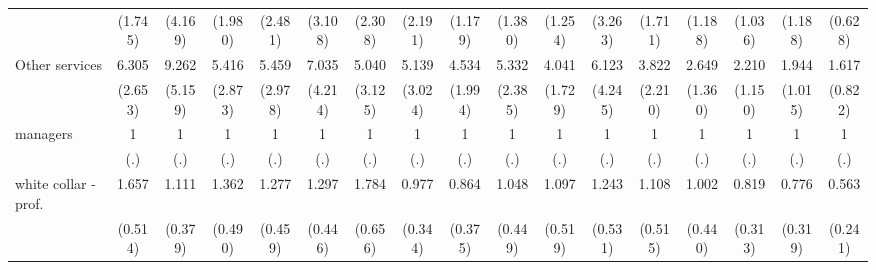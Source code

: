 {\begin{tabular}{l*{16}{c}}
                    &     (1.745)         &     (4.169)         &     (1.980)         &     (2.481)         &     (3.108)         &     (2.308)         &     (2.191)         &     (1.179)         &     (1.380)         &     (1.254)         &     (3.263)         &     (1.711)         &     (1.188)         &     (1.036)         &     (1.188)         &     (0.628)         \\
[1em]
Other services      &       6.305\sym{***}&       9.262\sym{***}&       5.416\sym{**} &       5.459\sym{**} &       7.035\sym{**} &       5.040\sym{**} &       5.139\sym{**} &       4.534\sym{***}&       5.332\sym{***}&       4.041\sym{**} &       6.123\sym{**} &       3.822\sym{*}  &       2.649         &       2.210         &       1.944         &       1.617         \\
                    &     (2.653)         &     (5.159)         &     (2.873)         &     (2.978)         &     (4.214)         &     (3.125)         &     (3.024)         &     (1.994)         &     (2.385)         &     (1.729)         &     (4.245)         &     (2.210)         &     (1.360)         &     (1.150)         &     (1.015)         &     (0.822)         \\
[1em]
managers            &           1         &           1         &           1         &           1         &           1         &           1         &           1         &           1         &           1         &           1         &           1         &           1         &           1         &           1         &           1         &           1         \\
                    &         (.)         &         (.)         &         (.)         &         (.)         &         (.)         &         (.)         &         (.)         &         (.)         &         (.)         &         (.)         &         (.)         &         (.)         &         (.)         &         (.)         &         (.)         &         (.)         \\
[1em]
white collar - prof.&       1.657         &       1.111         &       1.362         &       1.277         &       1.297         &       1.784         &       0.977         &       0.864         &       1.048         &       1.097         &       1.243         &       1.108         &       1.002         &       0.819         &       0.776         &       0.563         \\
                    &     (0.514)         &     (0.379)         &     (0.490)         &     (0.459)         &     (0.446)         &     (0.656)         &     (0.344)         &     (0.375)         &     (0.449)         &     (0.519)         &     (0.531)         &     (0.515)         &     (0.440)         &     (0.313)         &     (0.319)         &     (0.241)         \\

\end{tabular}}
